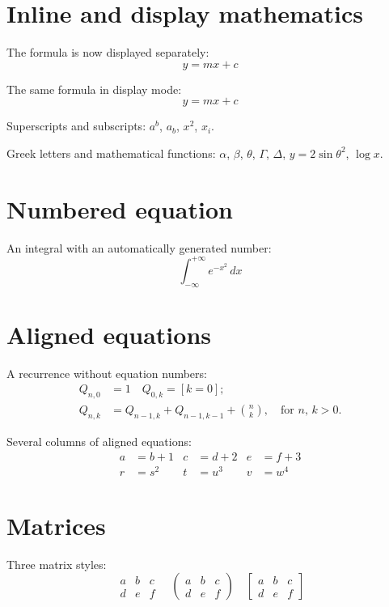 \documentclass[a4paper,12pt,fleqn,leqno]{article}
\begin{document}
\section{Inline and display mathematics}

The formula is now displayed separately:
\[
y = mx + c
\]

The same formula in display mode:
\[
y = mx + c
\]

Superscripts and subscripts:
$a^{b}$, $a_{b}$, $x^{2}$, $x_{i}$.

Greek letters and mathematical functions:
$\alpha$, $\beta$, $\theta$, $\Gamma$, $\Delta$,
$y = 2\sin\theta^{2}$, $\log x$.

\section{Numbered equation}

An integral with an automatically generated number:
\begin{equation}
\int_{-\infty}^{+\infty} e^{-x^{2}} \, dx
\end{equation}

\section{Aligned equations}

A recurrence without equation numbers:
\begin{align*}
Q_{n,0} &= 1 \quad Q_{0,k} = [k=0]; \\
Q_{n,k} &= Q_{n-1,k}+Q_{n-1,k-1}+\binom{n}{k},
           \quad\text{for $n$, $k>0$.}
\end{align*}

Several columns of aligned equations:
\begin{align*}
a &= b+1   & c &= d+2   & e &= f+3 \\
r &= s^{2} & t &= u^{3} & v &= w^{4}
\end{align*}

\section{Matrices}

Three matrix styles:
\[
\begin{matrix}
a & b & c \\
d & e & f
\end{matrix}
\quad
\begin{pmatrix}
a & b & c \\
d & e & f
\end{pmatrix}
\quad
\begin{bmatrix}
a & b & c \\
d & e & f
\end{bmatrix}
\]
\end{document}
